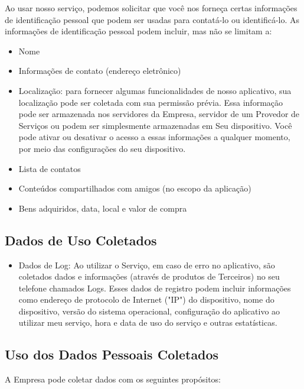 Ao usar nosso serviço, podemos solicitar que você nos forneça certas informações de identificação pessoal que podem ser usadas para contatá-lo ou identificá-lo. As informações de identificação pessoal podem incluir, mas não se limitam a:

\begin{itemize}
	\item Nome
	\item Informações de contato (endereço eletrônico)
	\item Localização: para fornecer algumas funcionalidades de nosso aplicativo, sua localização pode ser coletada com sua permissão prévia. Essa informação pode ser armazenada nos servidores da Empresa, servidor de um Provedor de Serviços ou podem ser simplesmente armazenadas em Seu dispositivo. Você pode ativar ou desativar o acesso a essas informações a qualquer momento, por meio das configurações do seu dispositivo.
	\item Lista de contatos
	\item Conteúdos compartilhados com amigos (no escopo da aplicação)
	\item Bens adquiridos, data, local e valor de compra
\end{itemize}

\subsection{Dados de Uso Coletados}

\begin{itemize}
	\item Dados de Log: Ao utilizar o Serviço, em caso de erro no aplicativo, são coletados dados e informações (através de produtos de Terceiros) no seu telefone chamados Logs. Esses dados de registro podem incluir informações como endereço de protocolo de Internet ("IP") do dispositivo, nome do dispositivo, versão do sistema operacional, configuração do aplicativo ao utilizar meu serviço, hora e data de uso do serviço e outras estatísticas.
\end{itemize}

\subsection{Uso dos Dados Pessoais Coletados}

A Empresa pode coletar dados com os seguintes propósitos:

